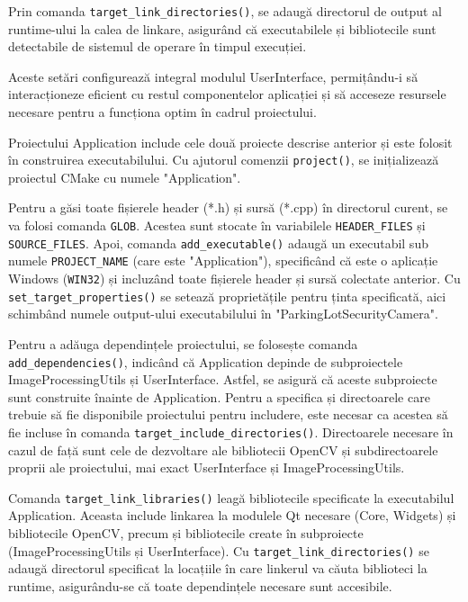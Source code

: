 \documentclass[a4paper,12pt]{report}
\begin{document}
Prin comanda \texttt{target\_link\_directories()}, se adaugă directorul de output al runtime-ului la calea de linkare, asigurând că executabilele și bibliotecile sunt detectabile de sistemul de operare în timpul execuției.

Aceste setări configurează integral modulul UserInterface, permițându-i să interacționeze eficient cu restul componentelor aplicației și să acceseze resursele necesare pentru a funcționa optim în cadrul proiectului.

Proiectului Application include cele două proiecte descrise anterior și este folosit în construirea executabilului. Cu ajutorul comenzii \texttt{project()}, se inițializează proiectul CMake cu numele "Application".

Pentru a găsi toate fișierele header (*.h) și sursă (*.cpp) în directorul curent, se va folosi comanda \texttt{GLOB}. Acestea sunt stocate în variabilele \texttt{HEADER\_FILES} și \texttt{SOURCE\_FILES}. Apoi, comanda \texttt{add\_executable()} adaugă un executabil sub numele \texttt{PROJECT\_NAME} (care este "Application"), specificând că este o aplicație Windows (\texttt{WIN32}) și incluzând toate fișierele header și sursă colectate anterior. Cu \texttt{set\_target\_properties()} se setează proprietățile pentru ținta specificată, aici schimbând numele output-ului executabilului în "ParkingLotSecurityCamera".

Pentru a adăuga dependințele proiectului, se folosește comanda \newline \texttt{add\_dependencies()}, indicând că Application depinde de subproiectele ImageProcessingUtils și UserInterface. Astfel, se asigură că aceste subproiecte sunt construite înainte de Application. Pentru a specifica și directoarele care trebuie să fie disponibile proiectului pentru includere, este necesar ca acestea să fie incluse în comanda \texttt{target\_include\_directories()}. Directoarele necesare în cazul de față sunt cele de dezvoltare ale bibliotecii OpenCV și subdirectoarele proprii ale proiectului, mai exact UserInterface și ImageProcessingUtils.

Comanda \texttt{target\_link\_libraries()} leagă bibliotecile specificate la executabilul Application. Aceasta include linkarea la modulele Qt necesare (Core, Widgets) și bibliotecile OpenCV, precum și bibliotecile create în subproiecte (ImageProcessingUtils și UserInterface). Cu \texttt{target\_link\_directories()} se adaugă directorul specificat la locațiile în care linkerul va căuta biblioteci la runtime, asigurându-se că toate dependințele necesare sunt accesibile.
\end{document}
